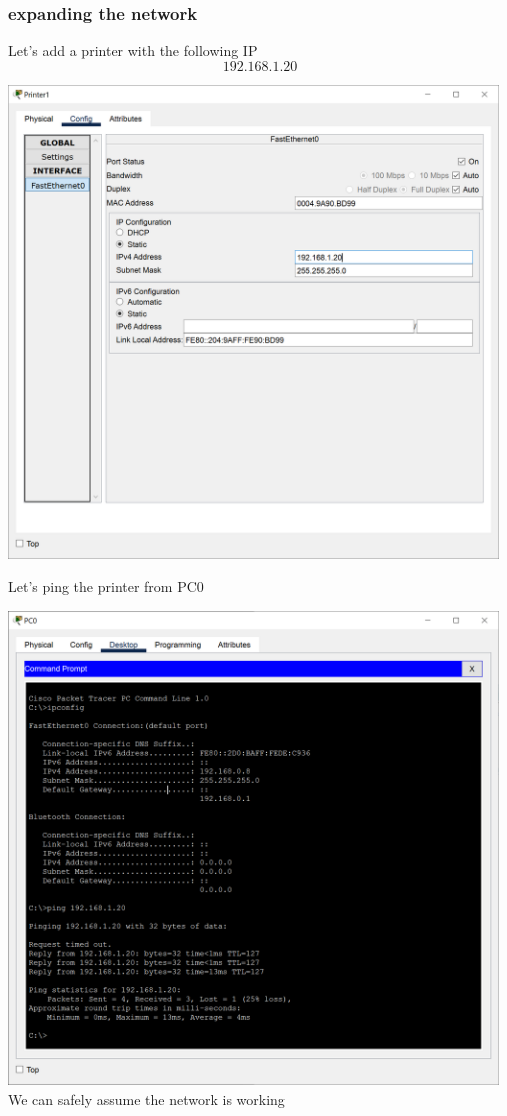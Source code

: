 \documentclass[a4paper,12pt]{article}
\begin{document}
\subsubsection{expanding the network}
\noindent Let's add a printer with the following IP
\[192.168.1.20\] \newline

\noindent \includegraphics[width=13cm]{./step-by-step/20.PNG}
\clearpage

\noindent Let's ping the printer from PC0\newline

\noindent \includegraphics[width=13cm]{./step-by-step/21.PNG} \newline
\noindent We can safely assume the network is working
\clearpage
\end{document}
